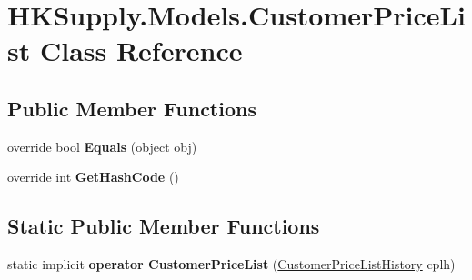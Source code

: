 \hypertarget{class_h_k_supply_1_1_models_1_1_customer_price_list}{}\section{H\+K\+Supply.\+Models.\+Customer\+Price\+List Class Reference}
\label{class_h_k_supply_1_1_models_1_1_customer_price_list}
\subsection*{Public Member Functions}
\begin{DoxyCompactItemize}
\item 
\mbox{\label{class_h_k_supply_1_1_models_1_1_customer_price_list_ae551975ef63846e1fbbe9365ee7bec13}} 
override bool {\bfseries Equals} (object obj)
\item 
\mbox{\label{class_h_k_supply_1_1_models_1_1_customer_price_list_a38fc8bd8cc56f4de7b4c4a42b981033a}} 
override int {\bfseries Get\+Hash\+Code} ()
\end{DoxyCompactItemize}
\subsection*{Static Public Member Functions}
\begin{DoxyCompactItemize}
\item 
\mbox{\label{class_h_k_supply_1_1_models_1_1_customer_price_list_ae1e26345bf4d53c695afe4cba578a663}} 
static implicit {\bfseries operator Customer\+Price\+List} (\mbox{\hyperlink{class_h_k_supply_1_1_models_1_1_customer_price_list_history}{Customer\+Price\+List\+History}} cplh)
\end{DoxyCompactItemize}

